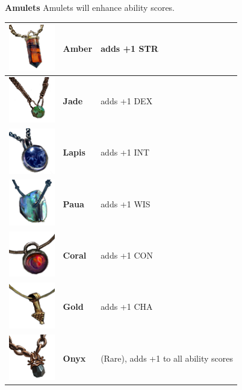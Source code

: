 

\textbf{Amulets} Amulets will enhance ability scores. \\

\begin{tabular}{m{2cm}m{3cm}m{4cm} } \hline
	\includegraphics[width=2cm]{../Pictures/Gameplay/Items/Wearables/Amulets/Amber_amulet_icon.png} & \textbf{Amber} & adds +1 STR \\ \hline
	\includegraphics[width=2cm]{../Pictures/Gameplay/Items/Wearables/Amulets/Jade_amulet_icon.png} & \textbf{Jade} & adds +1 DEX \\ \hline
	\includegraphics[width=2cm]{../Pictures/Gameplay/Items/Wearables/Amulets/Lapis_amulet_icon.png} & \textbf{Lapis} & adds +1 INT \\ \hline
	\includegraphics[width=2cm]{../Pictures/Gameplay/Items/Wearables/Amulets/Paua_amulet_icon.png} & \textbf{Paua} & adds +1 WIS \\ \hline
	\includegraphics[width=2cm]{../Pictures/Gameplay/Items/Wearables/Amulets/Coral_amulet_icon.png} & \textbf{Coral} & adds +1 CON \\ \hline
	\includegraphics[width=2cm]{../Pictures/Gameplay/Items/Wearables/Amulets/Gold_amulet_icon.png} & \textbf{Gold} & adds +1 CHA \\ \hline
	\includegraphics[width=2cm]{../Pictures/Gameplay/Items/Wearables/Amulets/Onyx_amulet_icon.png} & \textbf{Onyx} & (Rare), adds +1 to all ability scores \\ \hline
\end{tabular}

\clearpage